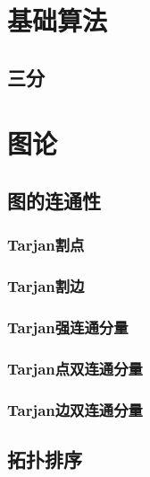 \documentclass{article}
\begin{document}
\begin{multicols*}{3}

\thispagestyle{empty}
\tableofcontents
\newpage
\setcounter{page}{1}
\section{基础算法}
\subsection{三分}


\section{图论}
\subsection{图的连通性}
\subsubsection{Tarjan割点}


\subsubsection{Tarjan割边}


\subsubsection{Tarjan强连通分量}


\subsubsection{Tarjan点双连通分量}


\subsubsection{Tarjan边双连通分量}


\subsection{拓扑排序}



\end{multicols*}
\end{document}
